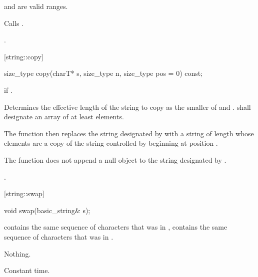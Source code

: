 \begin{itemdescr}
\pnum
\requires {} and  are valid ranges.

\pnum
\effects Calls .

\pnum
\returns
{}.
\end{itemdescr}


[string::copy]{}

%
%
\begin{itemdecl}
size_type copy(charT* s, size_type n, size_type pos = 0) const;
\end{itemdecl}

\begin{itemdescr}
\pnum
\requires
{}

\pnum
\throws
{}
if
.

\pnum
\effects
Determines the effective length 
of the string to copy as the smaller of  and
.
 shall designate an array of at least  elements.

The function then replaces the string designated by 
with a string of length  whose elements are a copy of the
string controlled by
beginning at position .

The function does not append a null object to the string designated
by .

\pnum
\returns
{}.
\end{itemdescr}

[string::swap]{}

%
%
\begin{itemdecl}
void swap(basic_string& s);
\end{itemdecl}

\begin{itemdescr}
\pnum
\postcondition
{}
contains the same sequence of characters that was in ,
 contains the same sequence of characters that was in
.

\pnum
\throws Nothing.

\pnum
\complexity Constant time.
\end{itemdescr}


